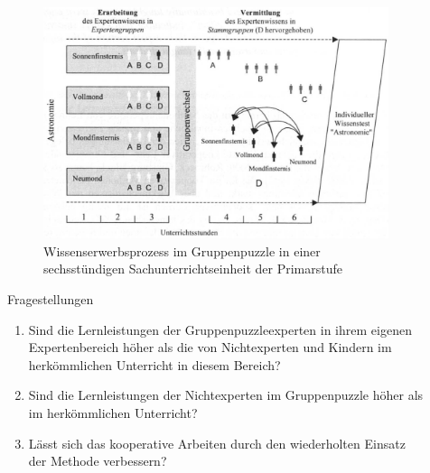 \documentclass[final]{beamer}
\newlength{\sepwid}
\newlength{\onecolwid}
\newlength{\twocolwid}
\begin{document}
\begin{frame}[t]
\begin{columns}[t]
\begin{column}{\onecolwid}
\begin{figure}
\includegraphics[width=1.0\linewidth]{experteneffekt.jpg}
\caption{Wissenserwerbsprozess im Gruppenpuzzle in einer sechsstündigen Sachunterrichtseinheit der Primarstufe}
\end{figure}


\begin{block}{Fragestellungen}
\begin{enumerate}
\item Sind die Lernleistungen der Gruppenpuzzleexperten in ihrem eigenen Expertenbereich höher als die von Nichtexperten und Kindern im herkömmlichen Unterricht in diesem Bereich?
\item Sind die Lernleistungen der Nichtexperten im Gruppenpuzzle höher als im herkömmlichen Unterricht?
\item Lässt sich das kooperative Arbeiten durch den wiederholten Einsatz der Methode verbessern?
\end{enumerate}
\end{block}


\end{column} %
\begin{column}{\sepwid}\end{column} %


\begin{column}{\twocolwid} %
\begin{columns}[t,totalwidth=\twocolwid] %
\begin{column}{\onecolwid}\vspace{-.6in} %



\end{column}
\end{columns}
\end{column}
\end{columns}
\end{frame}
\end{document}

